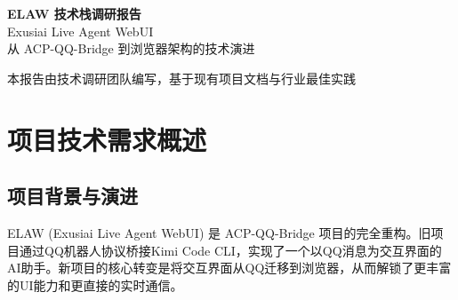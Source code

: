 \documentclass[fontset=mac,a4paper,11pt]{ctexart}
\begin{document}
\begin{titlepage}
\begin{center}
\vspace*{2cm}
{\Huge\bfseries\color{darkblue} ELAW 技术栈调研报告}\\[0.8cm]
{\Large\color{gray} Exusiai Live Agent WebUI}\\[0.3cm]
{\large 从 ACP-QQ-Bridge 到浏览器架构的技术演进}\\[2.5cm]
\vfill
{\small\color{gray} 本报告由技术调研团队编写，基于现有项目文档与行业最佳实践}
\end{center}
\end{titlepage}

\tableofcontents
\newpage

\section{项目技术需求概述}

\subsection{项目背景与演进}

ELAW (Exusiai Live Agent WebUI) 是 ACP-QQ-Bridge 项目的完全重构。旧项目通过QQ机器人协议桥接Kimi Code CLI，实现了一个以QQ消息为交互界面的AI助手。新项目的核心转变是将交互界面从QQ迁移到浏览器，从而解锁了更丰富的UI能力和更直接的实时通信。
\end{document}
